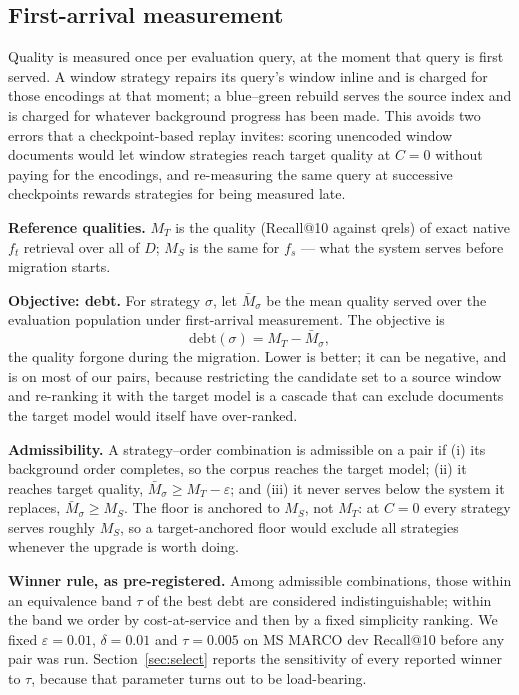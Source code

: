\documentclass[conference]{IEEEtran}
\newcommand{\debt}{\mathrm{debt}}
\begin{document}
\subsection{First-arrival measurement}
Quality is measured once per evaluation query, at the moment that query is first
served. A window strategy repairs its query's window inline and is charged for those
encodings at that moment; a blue--green rebuild serves the source index and is charged
for whatever background progress has been made. This avoids two errors that a
checkpoint-based replay invites: scoring unencoded window documents would let window
strategies reach target quality at $C{=}0$ without paying for the encodings, and
re-measuring the same query at successive checkpoints rewards strategies for being
measured late.

\textbf{Reference qualities.} $M_T$ is the quality (Recall@10 against qrels) of exact
native $f_t$ retrieval over all of $D$; $M_S$ is the same for $f_s$ --- what the system
serves before migration starts.

\textbf{Objective: debt.} For strategy $\sigma$, let $\bar M_\sigma$ be the mean quality
served over the evaluation population under first-arrival measurement. The objective is
\[
\debt(\sigma) = M_T - \bar M_\sigma ,
\]
the quality forgone during the migration. Lower is better; it can be negative, and is
on most of our pairs, because restricting the candidate set to a source window and
re-ranking it with the target model is a cascade that can exclude documents the target
model would itself have over-ranked.

\textbf{Admissibility.} A strategy--order combination is admissible on a pair if
(i) its background order completes, so the corpus reaches the target model;
(ii) it reaches target quality, $\bar M_\sigma \ge M_T - \varepsilon$; and (iii) it never
serves below the system it replaces, $\bar M_\sigma \ge M_S$. The floor is anchored to
$M_S$, not $M_T$: at $C{=}0$ every strategy serves roughly $M_S$, so a target-anchored
floor would exclude all strategies whenever the upgrade is worth doing.

\textbf{Winner rule, as pre-registered.} Among admissible combinations, those within an
equivalence band $\tau$ of the best $\debt$ are considered indistinguishable; within the
band we order by cost-at-service and then by a fixed simplicity ranking. We fixed
$\varepsilon = 0.01$, $\delta = 0.01$ and $\tau = 0.005$ on MS MARCO dev Recall@10
before any pair was run. Section~\ref{sec:select} reports the sensitivity of every
reported winner to $\tau$, because that parameter turns out to be load-bearing.
\end{document}
